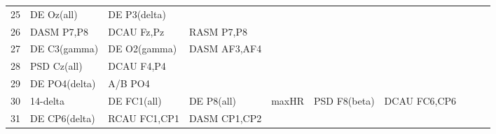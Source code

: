 \begin{landscape}
\begin{table}[]
\begin{tabular}{l|llllllll}
25       & DE Oz(all)            & DE P3(delta)          &                      &                         &                         &                      &                      &                       &                       &                    \\
26       & DASM P7,P8            & DCAU Fz,Pz            & RASM P7,P8           &                         &                         &                      &                      &                       &                       &                    \\
27       & DE C3(gamma)          & DE O2(gamma)          & DASM AF3,AF4         &                         &                         &                      &                      &                       &                       &                    \\
28       & PSD Cz(all)           & DCAU F4,P4            &                      &                         &                         &                      &                      &                       &                       &                    \\
29       & DE PO4(delta)         & A/B PO4               &                      &                         &                         &                      &                      &                       &                       &                    \\
30       & 14-delta              & DE FC1(all)           & DE P8(all)           & maxHR                   & PSD F8(beta)            & DCAU FC6,CP6         &                      &                       &                       &                    \\
31       & DE CP6(delta)         & RCAU FC1,CP1          & DASM CP1,CP2         &                         &                         &                      &                      &                       &                       &                    \\
\end{tabular}
\end{table}
\end{landscape}
\clearpage
